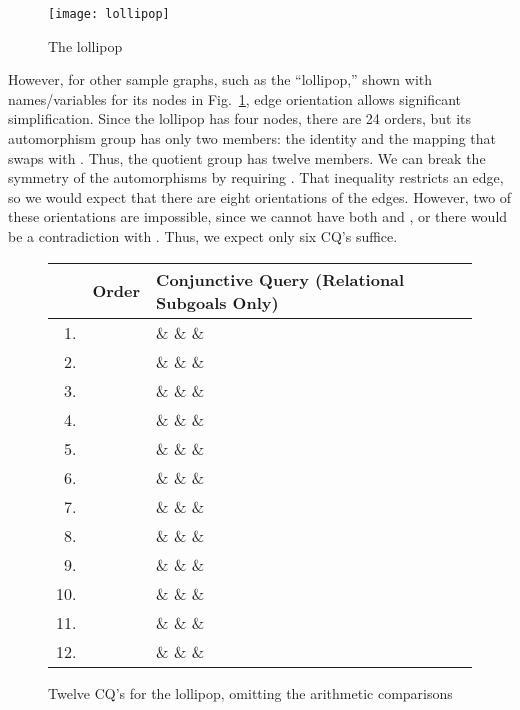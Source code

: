 \begin{figure}[htfb]
\centerline{\texttt{[image: lollipop]}}
\caption{The lollipop}
\label{lol-fig}
\end{figure}

However, for other sample graphs, such as the ``lollipop,'' shown with names/variables for its nodes in Fig.~\ref{lol-fig}, edge orientation allows significant simplification.
Since the lollipop has four nodes, there are 24 orders, but its automorphism group has only two members: the identity and the mapping that swaps  with .  Thus, the quotient group has twelve members.  We can break the symmetry of the automorphisms by requiring .  That inequality restricts an edge, so we would expect that there are eight orientations of the edges.  However, two of these orientations are impossible, since we cannot have both  and , or there would be a contradiction with .  Thus, we expect only six CQ's suffice.

\begin{figure}[htfb]
{\begin{center}
\begin{tabular}{r l l}
 & Order & Conjunctive Query (Relational Subgoals Only)\\
\hline
1. &  &  \&  \&  \& \\
2. &  &  \&  \&  \& \\
3. &  &  \&  \&  \& \\
4. &  &  \&  \&  \& \\
5. &  &  \&  \&  \& \\
6. &  &  \&  \&  \& \\
7. &  &  \&  \&  \& \\
8. &  &  \&  \&  \& \\
9. &  &  \&  \&  \& \\
10. &  &  \&  \&  \& \\
11. &  &  \&  \&  \& \\
12. &  &  \&  \&  \& \\
\end{tabular}
\end{center}
}
\caption{Twelve CQ's for the lollipop, omitting the arithmetic comparisons}
\label{lol-cqs-fig}

\end{figure}

